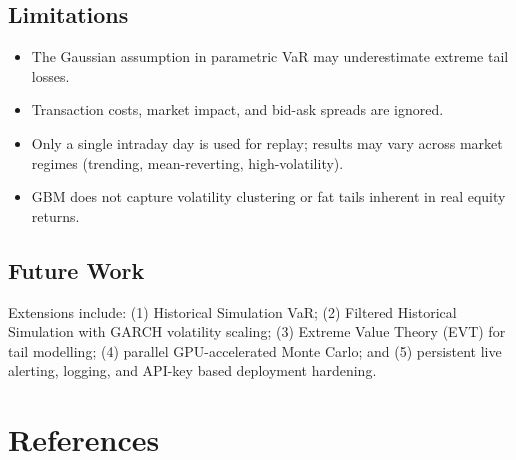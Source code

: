 \documentclass[12pt, a4paper]{article}
\begin{document}
\subsection{Limitations}

\begin{itemize}
  \item The Gaussian assumption in parametric VaR may underestimate
        extreme tail losses.
  \item Transaction costs, market impact, and bid-ask spreads are ignored.
  \item Only a single intraday day is used for replay; results may vary
        across market regimes (trending, mean-reverting, high-volatility).
  \item GBM does not capture volatility clustering or fat tails inherent
        in real equity returns.
\end{itemize}

\subsection{Future Work}

Extensions include: (1) Historical Simulation VaR; (2) Filtered Historical
Simulation with GARCH volatility scaling; (3) Extreme Value Theory (EVT)
for tail modelling; (4) parallel GPU-accelerated Monte Carlo; and (5)
persistent live alerting, logging, and API-key based deployment hardening.

\section*{References}


\end{document}
